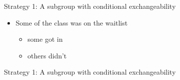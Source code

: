 \documentclass{beamer}
\begin{document}
\begin{frame}{Strategy 1: A subgroup with conditional exchangeability} \pause

\begin{itemize}
\item Some of the class was on the waitlist
\begin{itemize}
\item some got in
\item others didn't
\end{itemize}
\end{itemize}

\end{frame}

\begin{frame}{Strategy 1: A subgroup with conditional exchangeability}


\end{frame}
\end{document}
